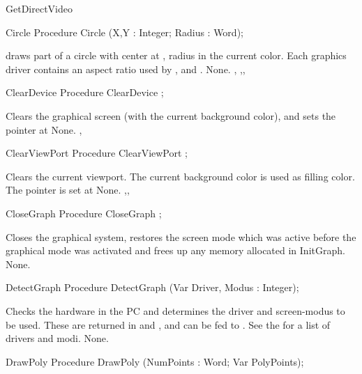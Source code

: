 \begin{function}{GetDirectVideo}
\begin{procedure}{Circle}
\Declaration
Procedure Circle (X,Y : Integer; Radius : Word);

\Description
  draws part of a circle with center at , radius
 in the current color. Each graphics driver contains an
aspect ratio used by ,  and .
\Errors
None.
\SeeAlso
{},
,, 
\end{procedure}

\begin{procedure}{ClearDevice}
\Declaration
Procedure ClearDevice ;

\Description
Clears the graphical screen (with the current
background color), and sets the pointer at 
\Errors
None.
\SeeAlso
{}, 
\end{procedure}

\begin{procedure}{ClearViewPort}
\Declaration
Procedure ClearViewPort ;

\Description
Clears the current viewport. The current background color is used as filling
color. The pointer is set at 
\Errors
None.
\SeeAlso
{},, 
\end{procedure}

\begin{procedure}{CloseGraph}
\Declaration
Procedure CloseGraph ;

\Description
Closes the graphical system, restores the
screen mode which was active before the graphical mode was
activated and frees up any memory allocated in InitGraph.
\Errors
None.
\SeeAlso
{}
\end{procedure}

\begin{procedure}{DetectGraph}
\Declaration
Procedure DetectGraph (Var Driver, Modus : Integer);

\Description
 Checks the hardware in the PC and determines the driver and screen-modus to
be used. These are returned in  and , and can be fed
to .
See the  for a list of drivers and modi.
\Errors
None.
\SeeAlso
{}
\end{procedure}


\begin{procedure}{DrawPoly}
\Declaration
Procedure DrawPoly (NumPoints : Word; Var PolyPoints);


\end{procedure}
\end{function}
